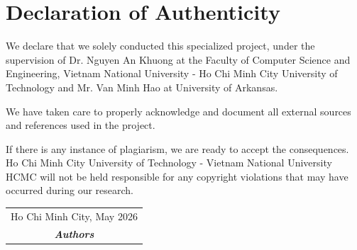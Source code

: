 \chapter*{Declaration of Authenticity}

We declare that we solely conducted this specialized project, under the supervision of Dr. Nguyen An Khuong at the Faculty of Computer Science and Engineering, Vietnam National University - Ho Chi Minh City University of Technology and Mr. Van Minh Hao at University of Arkansas.
 
\noindent We have taken care to properly acknowledge and document all external sources and references used in the project.
 
\noindent If there is any instance of plagiarism, we are ready to accept the consequences. Ho Chi Minh City University of Technology - Vietnam National University HCMC will not be held responsible for any copyright violations that may have occurred during our research.

\vspace{2cm}

\begin{flushright}
\begin{tabular}{c}
    Ho Chi Minh City, May 2026 \\
    \textit{\textbf{Authors}} 
    
\end{tabular}
\end{flushright}
